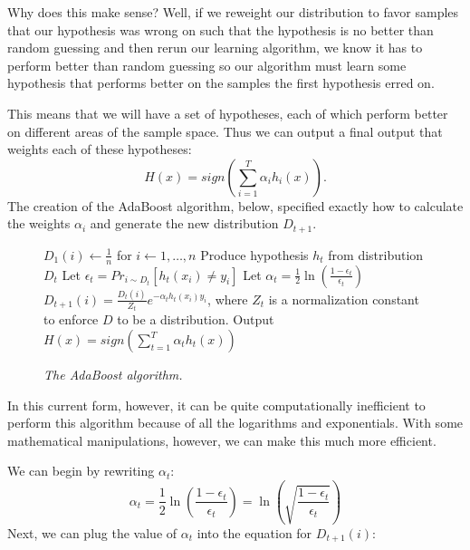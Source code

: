 \documentclass{article}
\begin{document}
Why does this make sense? Well, if we reweight our distribution to favor samples
that our hypothesis was wrong on such that the hypothesis is no better than
random guessing and then rerun our learning algorithm, we know it has to perform
better than random guessing so our algorithm must learn some hypothesis that
performs better on the samples the first hypothesis erred on.

This means that we will have a set of hypotheses, each of which perform better
on different areas of the sample space. Thus we can output a final output that
weights each of these hypotheses:
\begin{equation*}
    H(x) = sign\left(\sum_{i = 1}^{T} \alpha_i h_i(x)\right).
\end{equation*}
The creation of the AdaBoost algorithm, below, specified exactly how to
calculate the weights $\alpha_i$ and generate the new distribution $D_{t+1}$.

\begin{figure}[H]
\begin{framed}
    \begin{algorithmic}
        \State $D_1(i) \leftarrow \frac{1}{n}$ for $i \leftarrow 1,\ldots, n$
            \State Produce hypothesis $h_t$ from distribution $D_t$
            \State Let $\epsilon_t = Pr_{i\sim D_t} [h_t(x_i) \neq y_i]$
            \State Let $\alpha_t = \frac{1}{2}\ln\left(\frac{1 -
            \epsilon_t}{\epsilon_t}\right)$
            \State $D_{t+1}(i) = \frac{D_{t}(i)}{Z_t}e^{-\alpha_t h_t(x_i)
            y_i}$, where $Z_t$ is a normalization
            \State constant to enforce $D$ to be a distribution.
            \EndFor
        \EndFor
        \State
        \State Output $H(x) = sign\left(\sum_{t = 1}^{T} \alpha_t h_t(x)\right)$
    \end{algorithmic}
\end{framed}
\begin{center}
    \emph{The AdaBoost algorithm.}
\end{center}
\end{figure}

In this current form, however, it can be quite computationally inefficient to
perform this algorithm because of all the logarithms and exponentials. With
some mathematical manipulations, however, we can make this much more efficient.

We can begin by rewriting $\alpha_t$:
\begin{equation*}
    \alpha_t = \frac{1}{2}\ln\left(\frac{1 - \epsilon_t}{\epsilon_t}\right) =
    \ln\left(\sqrt{\frac{1 - \epsilon_t}{\epsilon_t}}\right)
\end{equation*}
Next, we can plug the value of $\alpha_t$ into the equation for $D_{t+1}(i)$:
\end{document}
